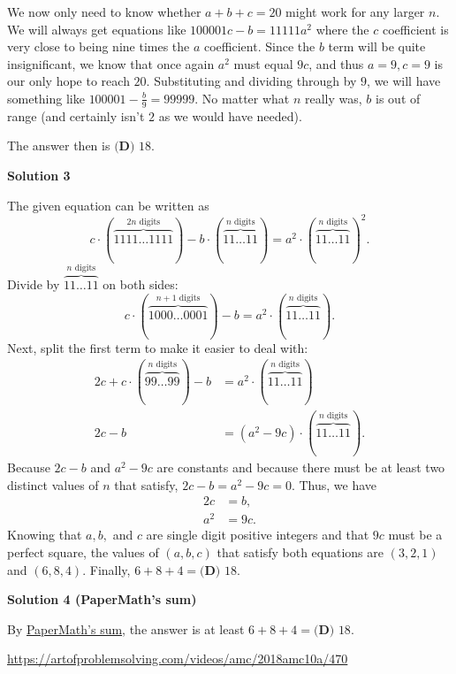 \begin{enumerate}
 We now only need to know whether $a + b + c = 20$ might work for any larger $n$. We will always get equations like $100001c - b = 11111a^2$ where the $c$ coefficient is very close to being nine times the $a$ coefficient. Since the $b$ term will be quite insignificant, we know that once again $a^2$ must equal $9c$, and thus $a = 9, c = 9$ is our only hope to reach $20$. Substituting and dividing through by $9$, we will have something like $100001 - \frac{b}{9} = 99999$. No matter what $n$ really was, $b$ is out of range (and certainly isn't $2$ as we would have needed).

 The answer then is $\boxed{\textbf{(D) } 18}$.

 



\textbf{Solution 3}

The given equation can be written as
 \[c \cdot (\phantom{ } \overbrace{1111 \ldots 1111}^{2n\text{ digits}}\phantom{ }) - b \cdot (\phantom{ } \overbrace{11 \ldots 11}^{n\text{ digits}} \phantom{ }) = a^2 \cdot (\phantom{ } \overbrace{11 \ldots 11}^{n\text{ digits}} \phantom{ })^2.\]Divide by $\overbrace{11 \ldots 11}^{n\text{ digits}}$ on both sides:
 \[c \cdot (\phantom{ } \overbrace{1000 \ldots 0001}^{n+1\text{ digits}}\phantom{ }) - b = a^2 \cdot (\phantom{ } \overbrace{11 \ldots 11}^{n\text{ digits}} \phantom{ }).\]Next, split the first term to make it easier to deal with:
 \begin{align*} 2c + c \cdot (\phantom{ }\overbrace{99 \ldots 99}^{n\text{ digits}}\phantom{ }) - b &= a^2 \cdot (\phantom{ } \overbrace{11 \ldots 11}^{n\text{ digits}} \phantom{ }) \\ 2c - b &= (a^2 - 9c) \cdot (\phantom{ }\overbrace{11 \ldots 11}^{n\text{ digits}}\phantom{ }). \end{align*}
Because $2c - b$ and $a^2 - 9c$ are constants and because there must be at least two distinct values of $n$ that satisfy, $2c - b = a^2 - 9c = 0.$ Thus, we have
 \begin{align*} 2c&=b, \\ a^2&=9c. \end{align*}
Knowing that $a,b,$ and $c$ are single digit positive integers and that $9c$ must be a perfect square, the values of $(a,b,c)$ that satisfy both equations are $(3,2,1)$ and $(6,8,4).$ Finally, $6 + 8 + 4 = \boxed{\textbf{(D) } 18}.$




\textbf{Solution 4 (PaperMath's sum)}

By \href{https://artofproblemsolving.com/wiki/index.php?title=PaperMath\%E2\%80\%99s\_sum}{PaperMath’s sum}, the answer is at least $6+8+4=\boxed{\textbf{(D) } 18}.$

 \href{https://artofproblemsolving.com/videos/amc/2018amc10a/470}{https://artofproblemsolving.com/videos/amc/2018amc10a/470}

 


\end{enumerate}